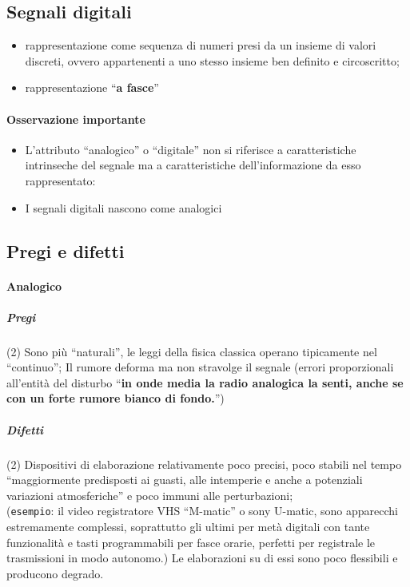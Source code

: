 \documentclass{book}
\begin{document}
\subsection{Segnali digitali\label{sdigital}}
\begin{itemize}
	\item rappresentazione come sequenza di numeri presi da un insieme di
		valori discreti, ovvero appartenenti a uno stesso insieme ben definito
		e circoscritto;
	\item rappresentazione ``{\bf a fasce}''
\end{itemize}
\paragraph{Osservazione importante}
\begin{itemize}
	\item L'attributo ``analogico'' o ``digitale'' non si riferisce a
		caratteristiche intrinseche del segnale ma a caratteristiche
		dell'informazione da esso rappresentato:
	\item {\color{red} I segnali digitali nascono come analogici}
\end{itemize}
\subsection{Pregi e difetti}
\paragraph{Analogico}
\subparagraph{Pregi}
\begin{tasks}(2)
	\task Sono più ``naturali'', le leggi della fisica classica operano
	tipicamente nel ``continuo'';
	\task Il rumore deforma ma non stravolge il segnale (errori proporzionali
	all'entità del disturbo ``{\bf in onde media la radio analogica la senti,
	anche se con un forte rumore bianco di fondo.}'')
\end{tasks}
\subparagraph{Difetti}
\begin{tasks}(2)
	\task Dispositivi di elaborazione relativamente poco precisi, poco stabili
	nel tempo ``maggiormente predisposti ai guasti, alle intemperie e anche a
	potenziali variazioni atmosferiche'' e poco immuni alle perturbazioni;\\
	({\tt esempio}: il video registratore VHS ``M-matic'' o sony U-matic, sono
	apparecchi estremamente complessi, soprattutto gli ultimi per metà digitali
	con tante funzionalità e tasti programmabili per fasce orarie, perfetti per
	registrale le trasmissioni in modo autonomo.)
	\task Le elaborazioni su di essi sono poco flessibili e producono degrado.
\end{tasks}
\end{document}
